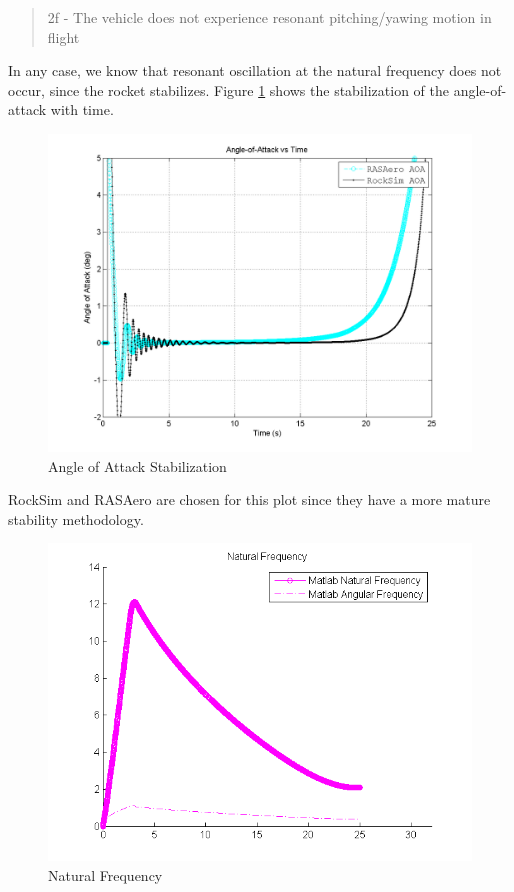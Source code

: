 \documentclass[]{article}
\begin{document}
\begin{quote}
2f - The vehicle does not experience resonant pitching/yawing motion in
flight
\end{quote}

In any case, we know that resonant oscillation at the natural frequency
does not occur, since the rocket stabilizes. Figure
\ref{error_stability_response} shows the stabilization of the
angle-of-attack with time.

\begin{figure}[htbp]
\centering
\includegraphics{images/plots/error_aoa_plot.png}
\caption{Angle of Attack Stabilization \label{error_stability_response}}
\end{figure}

RockSim and RASAero are chosen for this plot since they have a more
mature stability methodology.

\begin{figure}[htbp]
\centering
\includegraphics{images/plots/plot_natural_frequency.png}
\caption{Natural Frequency \label{plot_natural_frequency}}
\end{figure}
\end{document}
